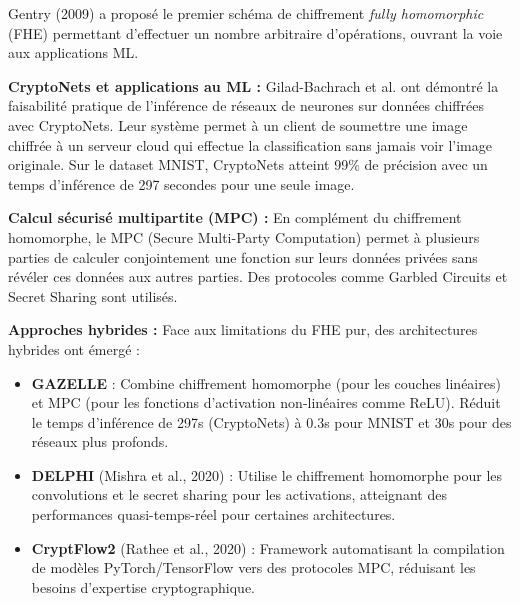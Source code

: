 Gentry (2009) a proposé le premier schéma de chiffrement \textit{fully homomorphic} (FHE) permettant d'effectuer un nombre arbitraire d'opérations, ouvrant la voie aux applications ML.

\textbf{CryptoNets et applications au ML :} Gilad-Bachrach et al. \cite{gilad2016cryptonets} ont démontré la faisabilité pratique de l'inférence de réseaux de neurones sur données chiffrées avec CryptoNets. Leur système permet à un client de soumettre une image chiffrée à un serveur cloud qui effectue la classification sans jamais voir l'image originale. Sur le dataset MNIST, CryptoNets atteint 99\% de précision avec un temps d'inférence de 297 secondes pour une seule image.

\textbf{Calcul sécurisé multipartite (MPC) :} En complément du chiffrement homomorphe, le MPC (Secure Multi-Party Computation) permet à plusieurs parties de calculer conjointement une fonction sur leurs données privées sans révéler ces données aux autres parties. Des protocoles comme Garbled Circuits et Secret Sharing sont utilisés.

\textbf{Approches hybrides :} Face aux limitations du FHE pur, des architectures hybrides ont émergé :
\begin{itemize}
    \item \textbf{GAZELLE} \cite{juvekar2018gazelle} : Combine chiffrement homomorphe (pour les couches linéaires) et MPC (pour les fonctions d'activation non-linéaires comme ReLU). Réduit le temps d'inférence de 297s (CryptoNets) à 0.3s pour MNIST et 30s pour des réseaux plus profonds.

    \item \textbf{DELPHI} (Mishra et al., 2020) : Utilise le chiffrement homomorphe pour les convolutions et le secret sharing pour les activations, atteignant des performances quasi-temps-réel pour certaines architectures.

    \item \textbf{CryptFlow2} (Rathee et al., 2020) : Framework automatisant la compilation de modèles PyTorch/TensorFlow vers des protocoles MPC, réduisant les besoins d'expertise cryptographique.
\end{itemize}

